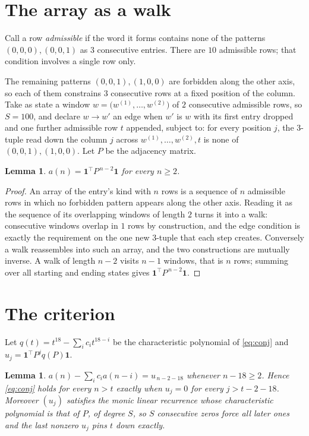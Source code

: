 \documentclass[11pt,a4paper]{article}
\theoremstyle{plain}
\newtheorem{lemma}[theorem]{Lemma}
\theoremstyle{definition}
\begin{document}
\section{The array as a walk}

Call a row \emph{admissible} if the word it forms contains none of the patterns
$(0,0,0), (0,0,1)$ as $3$ consecutive entries. There are $10$ admissible rows; that condition
involves a single row only.

The remaining patterns $(0,0,1), (1,0,0)$ are forbidden along the other axis, so each of them
constrains $3$ consecutive rows at a fixed position of the column. Take as state a
window $w=\bigl(w^{(1)},\dots,w^{(2)}\bigr)$ of $2$ consecutive admissible
rows, so $S=100$, and declare $w\to w'$ an edge when $w'$ is $w$ with its first entry
dropped and one further admissible row $t$ appended, subject to: for every position
$j$, the $3$-tuple read down the column $j$ across $w^{(1)},\dots,w^{(2)},t$
is none of $(0,0,1), (1,0,0)$. Let $P$ be the adjacency matrix.

\begin{lemma}\label{lem:walk}
$a(n)=\mathbf{1}^{\!\top}P^{\,n-2}\mathbf{1}$ for every $n\ge2$.
\end{lemma}

\begin{proof}
An array of the entry's kind with $n$ rows is a sequence of $n$ admissible rows in
which no forbidden pattern appears along the other axis. Reading it as the sequence of its
overlapping windows of length $2$ turns it into a walk: consecutive windows overlap in
$1$ rows by construction, and the edge condition is exactly the requirement on the one
new $3$-tuple that each step creates. Conversely a walk reassembles into such an array,
and the two constructions are mutually inverse. A walk of length $n-2$ visits $n-1$
windows, that is $n$ rows; summing over all starting and ending states gives
$\mathbf{1}^{\!\top}P^{\,n-2}\mathbf{1}$.
\end{proof}

\section{The criterion}

Let $q(t)=t^{18}-\sum_i c_i t^{18-i}$ be the characteristic polynomial of
\eqref{eq:conj} and $u_j=\mathbf{1}^{\!\top}P^{j}q(P)\mathbf{1}$.

\begin{lemma}\label{lem:crit}
$a(n)-\sum_i c_i a(n-i)=u_{\,n-2-18}$ whenever $n-18\ge2$. Hence
\eqref{eq:conj} holds for every $n>t$ exactly when $u_j=0$ for every
$j>t-2-18$. Moreover $(u_j)$ satisfies the monic linear recurrence whose
characteristic polynomial is that of $P$, of degree $S$, so $S$ consecutive zeros force all
later ones and the last nonzero $u_j$ pins $t$ down exactly.
\end{lemma}
\end{document}
